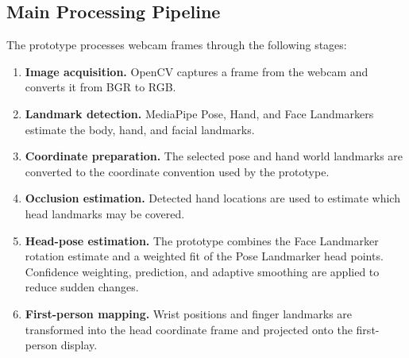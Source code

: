 \documentclass[12pt,a4paper]{article}
\begin{document}
\subsection{Main Processing Pipeline}

The prototype processes webcam frames through the following stages:

\begin{enumerate}[label=\arabic*.]
    \item \textbf{Image acquisition.} OpenCV captures a frame from the webcam and converts it from BGR to RGB.
    \item \textbf{Landmark detection.} MediaPipe Pose, Hand, and Face Landmarkers estimate the body, hand, and facial landmarks.
    \item \textbf{Coordinate preparation.} The selected pose and hand world landmarks are converted to the coordinate convention used by the prototype.
    \item \textbf{Occlusion estimation.} Detected hand locations are used to estimate which head landmarks may be covered.
    \item \textbf{Head-pose estimation.} The prototype combines the Face Landmarker rotation estimate and a weighted fit of the Pose Landmarker head points. Confidence weighting, prediction, and adaptive smoothing are applied to reduce sudden changes.
    \item \textbf{First-person mapping.} Wrist positions and finger landmarks are transformed into the head coordinate frame and projected onto the first-person display.
\end{enumerate}
\end{document}
